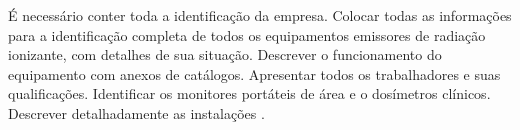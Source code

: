 \documentclass[
	12pt,				%
    oneside,			%
	a4paper,			%
	english,			%
	french,				%
	spanish,			%
	brazil,				%
	]{abntex2}
\begin{document}
É necessário conter toda a identificação da empresa. Colocar todas as informações para a identificação completa de todos os equipamentos emissores de radiação ionizante, com detalhes de sua situação. Descrever o funcionamento do equipamento com anexos de catálogos. Apresentar todos os trabalhadores e suas qualificações. Identificar os monitores portáteis de área e o dosímetros clínicos. Descrever detalhadamente as instalações \cite{cnen2014}.





\postextual


% 

%
%






\end{document}
